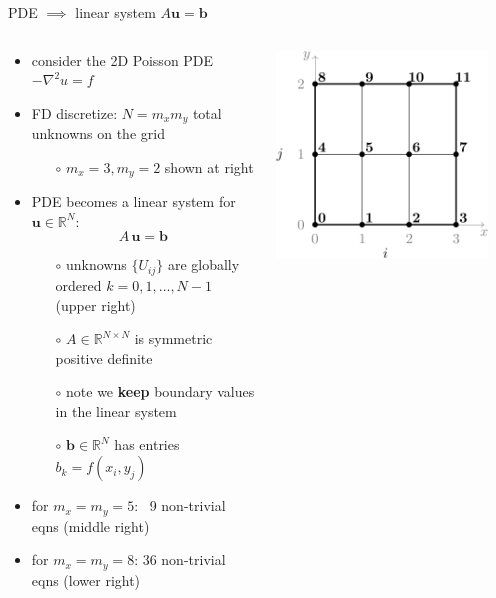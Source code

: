 \documentclass[10pt,
               svgnames,
               hyperref={colorlinks,citecolor=DeepPink4,linkcolor=FireBrick,urlcolor=Maroon},
               usepdftitle=false]{beamer}
\newcommand{\bb}{\mathbf{b}}
\newcommand{\bu}{\mathbf{u}}
\newcommand{\RR}{\mathbb{R}}
\newcommand{\grad}{\nabla}
\begin{document}
\begin{frame}{PDE $\implies$ linear system $A\bu=\bb$}
\begin{columns}
\begin{column}{0.73\textwidth}
\begin{itemize}
\item consider the 2D Poisson PDE $-\grad^2 u = f$
\item FD discretize: $N=m_x m_y$ total unknowns on the grid

	\begin{itemize}
	\item[$\circ$] $m_x=3,m_y=2$ shown at right
	\end{itemize}
\item PDE becomes a linear system for $\bu \in \RR^N$:
	$$A\, \bu = \bb$$

	\begin{itemize}
	\item[$\circ$] unknowns $\{U_{ij}\}$ are globally ordered $k=0,1,\dots,N-1$ (upper right)
	\item[$\circ$] $A \in \RR^{N\times N}$ is symmetric positive definite
	\item[$\circ$] note we \textbf{keep} boundary values in the linear system
	\item[$\circ$] $\bb \in \RR^N$ has entries $b_k = f(x_i,y_j)$
	\end{itemize}
\item for $m_x=m_y=5$: \,\,\,9 non-trivial eqns (middle right)
\item for $m_x=m_y=8$: 36 non-trivial eqns (lower right)
\end{itemize}
\end{column}
\begin{column}{0.27\textwidth}
\hfill \includegraphics[width=0.9\textwidth]{images/gridordering.png}


\end{column}
\end{columns}
\end{frame}
\end{document}
